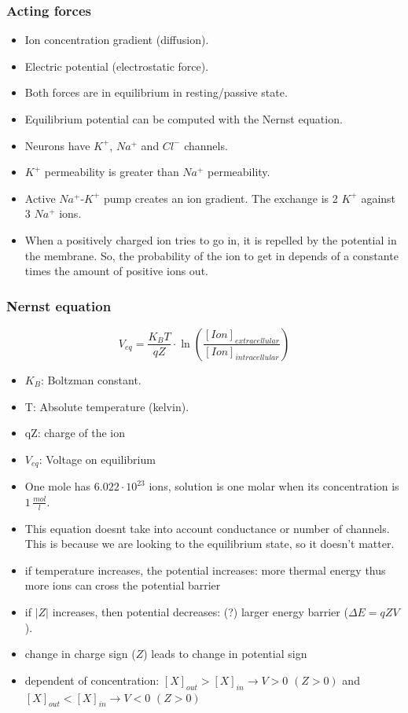 \documentclass[main]{subfiles}
\begin{document}
\subsubsection{Acting forces}
\begin{itemize}[noitemsep,nolistsep]
	\item Ion concentration gradient (diffusion).
	\item Electric potential (electrostatic force).
	\item Both forces are in equilibrium in resting/passive state.
	\item Equilibrium potential can be computed with the Nernst equation.
	\item Neurons have $K^+$, $Na^+$ and $Cl^-$ channels.
	\item $K^+$ permeability is greater than $Na^+$ permeability.
	\item Active $Na^+$-$K^+$ pump creates an ion gradient. The exchange is 2 $K^+$ against 3 $Na^+$ ions.
	\item When a positively charged ion tries to go in, it is repelled by the potential in the membrane. So, the probability of the ion to get in depends of a constante times the amount of positive ions out.
\end{itemize}

\subsubsection{Nernst equation}
\[V_{eq} = \frac{K_BT}{qZ} \cdot \ln (\frac{[Ion]_{extracellular}}{[Ion]_{intracellular}})\]

\begin{itemize}[noitemsep,nolistsep]
	\item $K_B$: Boltzman constant.
	\item T: Absolute temperature (kelvin).
	\item qZ: charge of the ion
	\item $V_{eq}$: Voltage on equilibrium
	\item One mole has $6.022\cdot10^{23}$ ions, solution is one molar when its concentration is $1\,\frac{mol}{l}$.
	\item This equation doesnt take into account conductance or number of channels. This is because we are looking to the equilibrium state, so it doesn't matter.
	\item if temperature increases, the potential increases: more thermal energy thus more ions can cross the potential barrier
	\item if $|Z|$ increases, then potential decreases: (?) larger energy barrier ($\Delta E = qZV$).
	\item change in charge sign ($Z$) leads to change in potential sign
	\item dependent of concentration: $[X]_{out} > [X]_{in} \to V > 0$ $(Z > 0)$ and $[X]_{out} < [X]_{in} \to V < 0$ $(Z > 0)$
\end{itemize}
\end{document}
